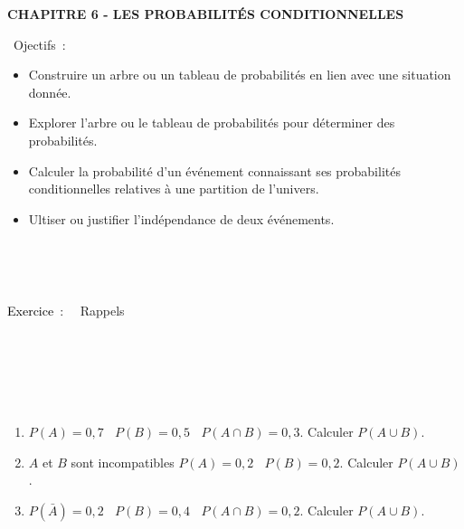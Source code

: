 \documentclass[11pt,a4paper]{article}
\newcounter{numexos}%
\newcommand{\exercice}[1]{%
\addtocounter{numexos}{1}%
\textcolor{black}{\normalsize Exercice\,\thenumexos\,}\,#1%
}
\newcommand{\bex}[2]
{\begin{bclogo}[couleur = white,logo= , barre=none,  arrondi = 0.1]
{~\exercice:~~{#1}}
~~
{#2}
~~
\end{bclogo}}
\newcommand{\cadre}[1]
{\begin{bclogo}[couleur = white,logo=,  arrondi = 0.1,barre=none]
~~
{%
\rule{0mm}{#1mm}}\par
\medskip
~~
\end{bclogo}}
\begin{document}
\begin{mybox}
\begin{center}    
\textbf{\Large CHAPITRE 6 - LES PROBABILITÉS CONDITIONNELLES}\end{center}
\end{mybox}
\vfill

\begin{bclogo}[couleur = white,logo=\bcinfo,  arrondi = 0.1]
{~Ojectifs~:}
~~
\begin{itemize}
\item Construire un arbre ou un tableau de probabilités en lien avec une situation donnée.
\item Explorer l'arbre ou le tableau de probabilités pour déterminer des probabilités.
\item Calculer la probabilité d'un événement connaissant ses probabilités conditionnelles relatives à une partition de l'univers.
\item Ultiser ou justifier l'indépendance de deux événements.  
\end{itemize}
~~
\end{bclogo}

\vfill 


\bex{Rappels }{}
\cadre{1}


\begin{enumerate}
	\item $P(A)=0,7 ~~~~ P(B)=0,5 ~~~~ P(A\cap B)=0,3$. Calculer $P(A\cup B)$.\\[3pt] 
    
	\dotfill
    
	\item $A$ et $B$ sont incompatibles $P(A)=0,2 ~~~~ P(B)=0,2 $. Calculer $P(A\cup B)$.\\[3pt] 
    
	\dotfill
    
	\item $P(\bar{A})=0,2 ~~~~ P(B)=0,4 ~~~~ P(A\cap B)=0,2$. Calculer $P(A\cup B)$.\\[3pt] 
    
	\dotfill
    
\end{enumerate}


\vfill 
\end{document}
